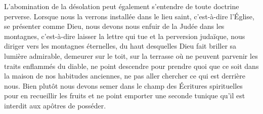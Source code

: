 L'abomination de la désolation peut également s'entendre de toute doctrine perverse.
Lorsque nous la verrons installée dans le lieu saint, c'est-à-dire l'Église,
		se présenter comme Dieu,	 
	nous devons nous enfuir de la Judée dans les montagnes,	 
	c'est-à-dire laisser la lettre qui tue et la perversion judaïque,	 
	nous diriger vers les montagnes éternelles,
		du haut desquelles Dieu fait briller sa lumière admirable,
	demeurer sur le toit,
		sur la terrasse où ne peuvent parvenir les traits enflammés du diable,
	ne point descendre pour prendre quoi que ce soit
		dans la maison de nos habitudes anciennes,
	ne pas aller chercher ce qui est derrière nous.
Bien plutôt nous devons semer dans le champ des Écritures spirituelles
		pour en recueillir les fruits
	et ne point emporter une seconde tunique qu'il est interdit aux apôtres de posséder.
